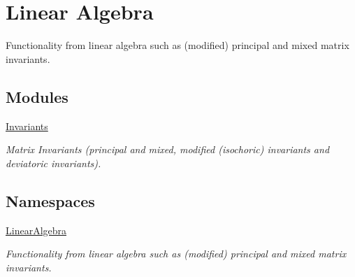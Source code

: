 \hypertarget{group__LinearAlgebraGroup}{\section{Linear Algebra}
\label{group__LinearAlgebraGroup}
}


Functionality from linear algebra such as (modified) principal and mixed matrix invariants.  


\subsection*{Modules}
\begin{DoxyCompactItemize}
\item 
\hyperlink{group__InvariantGroup}{Invariants}
\begin{DoxyCompactList}\small\item\em Matrix Invariants (principal and mixed, modified (isochoric) invariants and deviatoric invariants). \end{DoxyCompactList}\end{DoxyCompactItemize}
\subsection*{Namespaces}
\begin{DoxyCompactItemize}
\item 
\hyperlink{namespaceLinearAlgebra}{Linear\-Algebra}
\begin{DoxyCompactList}\small\item\em Functionality from linear algebra such as (modified) principal and mixed matrix invariants. \end{DoxyCompactList}\end{DoxyCompactItemize}
